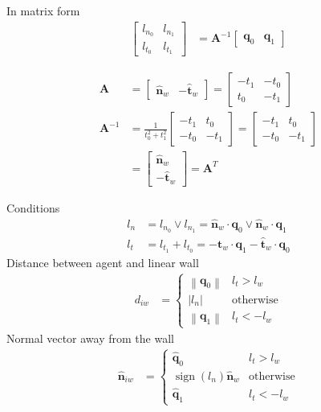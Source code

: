 In matrix form
\begin{align}
\begin{bmatrix} l_{n_0} & l_{n_1} \\ l_{t_0} & l_{t_1} \end{bmatrix} &= \mathbf{A}^{-1} \begin{bmatrix} \mathbf{q}_{0} & \mathbf{q}_{1} \end{bmatrix}
\end{align}

\begin{align}
\mathbf{A} 
&= \begin{bmatrix} \hat{\mathbf{n}}_{w} & -\hat{\mathbf{t}}_{w} \end{bmatrix} 
= \left[\begin{matrix}- t_{1} & - t_{0}\\t_{0} & - t_{1}\end{matrix}\right] \\
\mathbf{A}^{-1} 
&= \frac{1}{t_{0}^{2} + t_{1}^{2}} \left[\begin{matrix}- t_{1} & t_{0}\\- t_{0} & - t_{1}\end{matrix}\right]
= \left[\begin{matrix}- t_{1} & t_{0}\\- t_{0} & - t_{1}\end{matrix}\right] \\
&= \begin{bmatrix} \hat{\mathbf{n}}_{w} \\ -\hat{\mathbf{t}}_{w} \end{bmatrix} = \mathbf{A}^{T}
\end{align}

Conditions
\begin{align}
l_{n} &= l_ {n_0} \vee l_{n_1} = \hat{\mathbf{n}}_{w} \cdot \mathbf{q}_{0} \vee \hat{\mathbf{n}}_{w} \cdot \mathbf{q}_{1} \\
l_{t} &= l_{t_1} + l_{t_0} = - \hat{\mathbf{t}}_{w} \cdot \mathbf{q}_{1} - \hat{\mathbf{t}}_{w} \cdot \mathbf{q}_{0}
\end{align}
Distance between agent and linear wall
\begin{align}
d_{iw} &=
\begin{cases}
\left\|\mathbf{q}_{0}\right\| & l_{t} > l_{w} \\
\left|l_{n}\right| & \text{otherwise} \\
\left\|\mathbf{q}_{1}\right\| & l_{t} < -l_{w}
\end{cases}
\end{align}
Normal vector away from the wall
\begin{align}
\hat{\mathbf{n}}_{iw} &=
\begin{cases}
\hat{\mathbf{q}}_{0} & l_{t} > l_{w} \\
\operatorname{sign}(l_{n})\hat{\mathbf{n}}_{w} & \text{otherwise} \\
\hat{\mathbf{q}}_{1} & l_{t} < -l_{w}
\end{cases}
\end{align}

